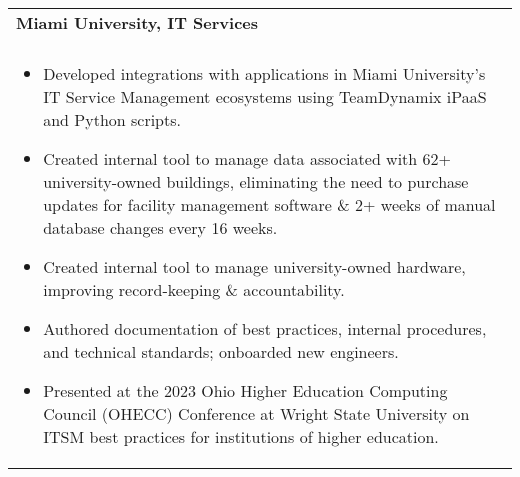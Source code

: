 \documentclass[letterpaper,10pt]{article} %
\begin{document}
\begin{tabular*}{\linewidth}{@{\extracolsep{\fill}} lr }
\textbf{Miami University, IT Services} & \scriptsize\bfseries\color{sectioncolour}{Oxford, OH}\\
\footnotesize\bfseries\color{sectioncolour}{Software Engineer Intern} & \scriptsize\bfseries\color{sectioncolour}{May 2022 - May 2024}\\
\multicolumn{2}{p{\linewidth}}{
    \scriptsize{\vspace{-0.1in}\begin{itemize}
        \item Developed integrations with applications in Miami University's IT Service Management ecosystems using TeamDynamix iPaaS and Python scripts.
        \item Created internal tool to manage data associated with 62+ university-owned buildings, eliminating the need to purchase updates for facility management software \& 2+ weeks of manual database changes every 16 weeks.
        \item Created internal tool to manage university-owned hardware, improving record-keeping \& accountability.
        \item Authored documentation of best practices, internal procedures, and technical standards; onboarded new engineers.
        \item Presented at the 2023 Ohio Higher Education Computing Council (OHECC) Conference at Wright State University on ITSM best practices for institutions of higher education.
    \end{itemize}\vspace{-0.1in}}
}\\


\end{tabular*}
\end{document}
